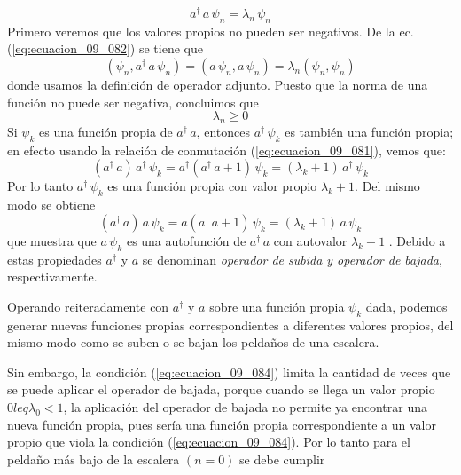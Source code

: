 {\begin{equation}
a^{\dagger} \, a \, \psi_{n} = \lambda_{n} \, \psi_{n}
\label{eq:ecuacion_09_082}
\end{equation}
Primero veremos que los valores propios no pueden ser negativos. De la ec. (\ref{eq:ecuacion_09_082}) se tiene que
\begin{equation}
(\psi_{n}, a^{\dagger} \, a \, \psi_{n}) = ( a \, \psi_{n}, a \, \psi_{n} ) = \lambda_{n} (\psi_{n}, \psi_{n})
\label{eq:ecuacion_09_083}
\end{equation}
donde usamos la definición de operador adjunto. Puesto que la norma de una función no puede
ser negativa, concluimos que
\begin{equation}
\lambda_{n} \geq 0
\label{eq:ecuacion_09_084}
\end{equation}
Si $\psi_{k}$ es una función propia de $a^{\dagger} \, a$, entonces $a^{\dagger} \, \psi_{k}$ es también una función propia; en efecto usando la relación de conmutación (\ref{eq:ecuacion_09_081}), vemos que:
\begin{equation}
(a^{\dagger} \, a) \, a^{\dagger} \, \psi_{k} = a^{\dagger} (a^{\dagger} \, a + 1) \, \psi_{k} = (\lambda_{k} + 1) \, a^{\dagger} \, \psi_{k}
\label{eq:ecuacion_09_085}
\end{equation}
Por lo tanto $a^{\dagger} \, \psi_{k}$ es una función propia con valor propio $\lambda_{k} + 1$. Del mismo modo se obtiene
\begin{equation}
(a^{\dagger} \, a) \, a \, \psi_{k} = a (a^{\dagger} \, a + 1) \, \psi_{k} = (\lambda_{k} + 1) \, a \, \psi_{k}
\label{eq:ecuacion_09_086}
\end{equation}
que muestra que $a \, \psi_{k}$ es una autofunción de $a^{\dagger} \, a$ con autovalor $\lambda_{k} - 1$ . Debido a estas propiedades $a^{\dagger}$ y $a$ se denominan \emph{operador de subida y operador de bajada}, respectivamente.
\par
Operando reiteradamente con $a^{\dagger}$ y $a$ sobre una función propia $\psi_{k}$ dada, podemos generar nuevas funciones propias correspondientes a diferentes valores propios, del mismo modo como se suben o se bajan los peldaños de una escalera.
\par
Sin embargo, la condición (\ref{eq:ecuacion_09_084}) limita la cantidad de veces que se
puede aplicar el operador de bajada, porque cuando se llega un valor propio $0 leq \lambda_{0} < 1$, la aplicación del operador de bajada no permite ya encontrar una nueva función propia, pues sería una función propia correspondiente a un valor propio que viola la condición (\ref{eq:ecuacion_09_084}). Por lo tanto para el peldaño más bajo de la escalera $(n = 0)$ se debe cumplir
}
